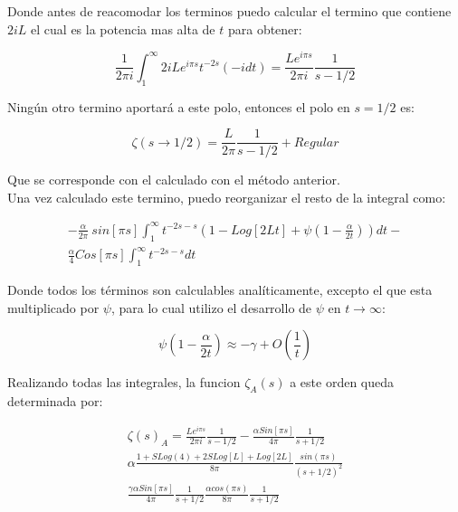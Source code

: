 Donde antes de reacomodar los terminos puedo calcular el termino que contiene $2iL$ el cual es la potencia mas alta de $t$ para obtener: 

\begin{equation}
    \frac{1}{2 \pi i }
    \int _1 ^{\infty}
    2 i L
    e^{i \pi s}
    t ^{-2 s}
    (-i dt) =  
    \frac{L e^{i \pi s} }{2 \pi i} \frac{1}{s-1/2   }
\end{equation}

Ningún otro termino aportará a este polo, entonces el polo en $s= 1/2$ es:

\begin{equation}
    \zeta  (s \rightarrow 1/2) = \frac{L}{2 \pi} \frac{1}{s- 1/2 } + Regular
\end{equation}

Que se corresponde con el calculado con el método anterior. \\

Una vez calculado este termino, puedo reorganizar el resto de la integral como:

\begin{equation}
\begin{array}{c}
    - \frac{\alpha}{2 \pi} \ sin[\pi s]
    \int _1 ^{\infty}
    t ^{-2 s-s} 
    \left(
    1 - Log[2Lt] + \psi (1- \frac{\alpha}{2t})
    \right) dt - \\ 
    \frac{\alpha}{4} 
    Cos[\pi s]
    \int _1 ^{\infty} t^{-2s-s} dt
\end{array}
\end{equation}

Donde todos los términos son calculables analíticamente, excepto el que esta multiplicado por $\psi$, para lo cual utilizo el desarrollo de $\psi$ en $t \rightarrow \infty$:

\begin{equation}
    \psi(1-\frac{\alpha}{2 t}) \approx 
    -\gamma + O \left( \frac{1}{t} \right)
\end{equation}

Realizando todas las integrales, la funcion $ \zeta _A (s)$ a este orden queda determinada por:  

\begin{equation}
\begin{array}{c}
    \zeta (s) _{A} = 
    \frac{L e ^{i \pi s}}{2 \pi i} \frac{1}{s-1/2} 
    -\frac{\alpha Sin[\pi s]}{4 \pi} \frac{1}{s+1/2} \\
    \alpha 
    \frac{
    1+S Log(4)+2SLog[L]+Log[2L]
    }
    {8 \pi} \frac{sin(\pi s)}{(s+1/2) ^2}  \\
    \frac{\gamma \alpha Sin[\pi s]}{4 \pi } \frac{1}{s+1/2} 
    \frac{\alpha cos(\pi s) }{8 \pi}  \frac{1}{s+1/2}  \\
\end{array}
\end{equation}

